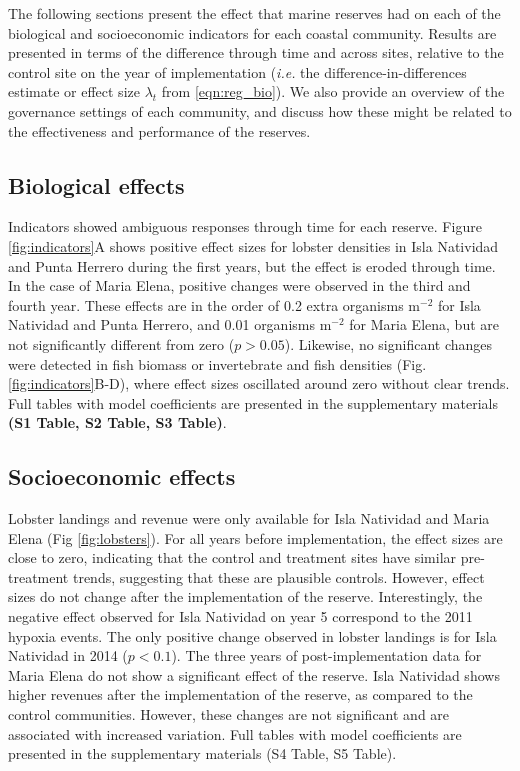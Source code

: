 \documentclass{frontiersSCNS}
\begin{document}
The following sections present the effect that marine reserves had on
each of the biological and socioeconomic indicators for each coastal
community. Results are presented in terms of the difference through time
and across sites, relative to the control site on the year of
implementation (\emph{i.e.} the difference-in-differences estimate or
effect size \(\lambda_t\) from \ref{eqn:reg_bio}). We also provide an
overview of the governance settings of each community, and discuss how
these might be related to the effectiveness and performance of the
reserves.

\hypertarget{biological-effects}{%
\subsection{Biological effects}\label{biological-effects}}

Indicators showed ambiguous responses through time for each reserve.
Figure \ref{fig:indicators}A shows positive effect sizes for lobster
densities in Isla Natividad and Punta Herrero during the first years,
but the effect is eroded through time. In the case of Maria Elena,
positive changes were observed in the third and fourth year. These
effects are in the order of 0.2 extra organisms \(\mathrm{m}^{-2}\) for
Isla Natividad and Punta Herrero, and 0.01 organisms \(\mathrm{m}^{-2}\)
for Maria Elena, but are not significantly different from zero
(\(p > 0.05\)). Likewise, no significant changes were detected in fish
biomass or invertebrate and fish densities (Fig.
\ref{fig:indicators}B-D), where effect sizes oscillated around zero
without clear trends. Full tables with model coefficients are presented
in the supplementary materials \textbf{(S1 Table, S2 Table, S3 Table)}.

\hypertarget{socioeconomic-effects}{%
\subsection{Socioeconomic effects}\label{socioeconomic-effects}}

Lobster landings and revenue were only available for Isla Natividad and
Maria Elena (Fig \ref{fig:lobsters}). For all years before
implementation, the effect sizes are close to zero, indicating that the
control and treatment sites have similar pre-treatment trends,
suggesting that these are plausible controls. However, effect sizes do
not change after the implementation of the reserve. Interestingly, the
negative effect observed for Isla Natividad on year 5 correspond to the
2011 hypoxia events. The only positive change observed in lobster
landings is for Isla Natividad in 2014 (\(p < 0.1\)). The three years of
post-implementation data for Maria Elena do not show a significant
effect of the reserve. Isla Natividad shows higher revenues after the
implementation of the reserve, as compared to the control communities.
However, these changes are not significant and are associated with
increased variation. Full tables with model coefficients are presented
in the supplementary materials (S4 Table, S5 Table).
\end{document}
